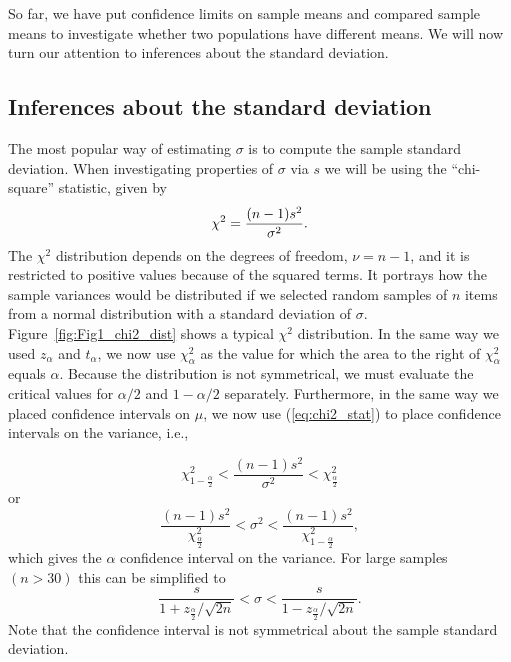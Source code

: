 So far, we have put confidence limits on sample means and compared sample means 
to investigate whether two populations have different means.  We will now turn our attention to 
inferences about the standard deviation.

\subsection{Inferences about the standard deviation}


The most popular way of estimating $\sigma$ is to compute the sample standard deviation.  When 
investigating properties of $\sigma$ via $s$ we will be using the ``chi-square'' statistic, given by
\begin{equation}
	\index{$\chi^2$ statistic (``chi-squared'')}
	\index{Chi-squared statistic ($\chi^2$)}
	\index{Probability distribution!Chi-squared}
	\index{Probability distribution!$\chi^2$}
\chi^2=\frac{(n-1)s^2}{\sigma^2}.
\label{eq:chi2_stat}	 	
\end{equation}
The $\chi^2$ distribution depends on the degrees of freedom, $\nu = n - 1$, and it is restricted to positive 
values because of the squared terms.  It portrays how the sample variances would be 
distributed if we selected random samples of $n$ items from a normal distribution with a standard deviation of $\sigma$.
Figure~\ref{fig:Fig1_chi2_dist} shows a typical $\chi^2$ distribution.
In the same way we used $z_\alpha$ and $t_\alpha$, we now use $\chi^2_\alpha$ as the value for which the area to the right 
of $\chi^2_\alpha$ equals $\alpha$.  Because the distribution is not symmetrical, we must evaluate the
critical values for $\alpha/2$ and $1 - \alpha/2$ separately.
Furthermore, in the same way we placed confidence intervals on $\mu$, we now 
use (\ref{eq:chi2_stat}) to place confidence intervals on the variance, i.e.,

\begin{equation}
\chi^2_{1-\frac{\alpha}{2}}<\frac{(n-1)s^2}{\sigma^2}<\chi^2_\frac{\alpha}{2}
\end{equation}	 
or
\begin{equation}	 
\frac{(n-1)s^2}{\chi^2_\frac{\alpha}{2}}<\sigma^2<\frac{(n-1)s^2}{\chi^2_{1-\frac{\alpha}{2}}},
\end{equation}
which gives the $\alpha$ confidence interval on the variance.  For large samples $(n > 30)$ this can be 
simplified to 
\begin{equation}
\frac{s}{1+{z_\frac{\alpha}{2}/\sqrt{2n}}}<\sigma<\frac{s}{1-{z_\frac{\alpha}{2}/\sqrt{2n}}}.
\end{equation}
Note that the confidence interval is not symmetrical about the sample standard deviation.

